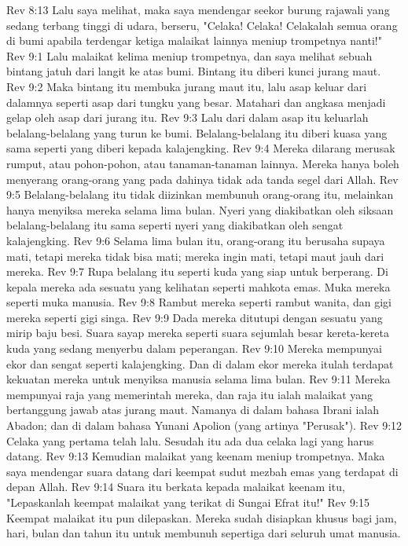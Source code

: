 Rev 8:13  Lalu saya melihat, maka saya mendengar seekor burung rajawali yang sedang terbang tinggi di udara, berseru, "Celaka! Celaka! Celakalah semua orang di bumi apabila terdengar ketiga malaikat lainnya meniup trompetnya nanti!"
Rev 9:1  Lalu malaikat kelima meniup trompetnya, dan saya melihat sebuah bintang jatuh dari langit ke atas bumi. Bintang itu diberi kunci jurang maut.
Rev 9:2  Maka bintang itu membuka jurang maut itu, lalu asap keluar dari dalamnya seperti asap dari tungku yang besar. Matahari dan angkasa menjadi gelap oleh asap dari jurang itu.
Rev 9:3  Lalu dari dalam asap itu keluarlah belalang-belalang yang turun ke bumi. Belalang-belalang itu diberi kuasa yang sama seperti yang diberi kepada kalajengking.
Rev 9:4  Mereka dilarang merusak rumput, atau pohon-pohon, atau tanaman-tanaman lainnya. Mereka hanya boleh menyerang orang-orang yang pada dahinya tidak ada tanda segel dari Allah.
Rev 9:5  Belalang-belalang itu tidak diizinkan membunuh orang-orang itu, melainkan hanya menyiksa mereka selama lima bulan. Nyeri yang diakibatkan oleh siksaan belalang-belalang itu sama seperti nyeri yang diakibatkan oleh sengat kalajengking.
Rev 9:6  Selama lima bulan itu, orang-orang itu berusaha supaya mati, tetapi mereka tidak bisa mati; mereka ingin mati, tetapi maut jauh dari mereka.
Rev 9:7  Rupa belalang itu seperti kuda yang siap untuk berperang. Di kepala mereka ada sesuatu yang kelihatan seperti mahkota emas. Muka mereka seperti muka manusia.
Rev 9:8  Rambut mereka seperti rambut wanita, dan gigi mereka seperti gigi singa.
Rev 9:9  Dada mereka ditutupi dengan sesuatu yang mirip baju besi. Suara sayap mereka seperti suara sejumlah besar kereta-kereta kuda yang sedang menyerbu dalam peperangan.
Rev 9:10  Mereka mempunyai ekor dan sengat seperti kalajengking. Dan di dalam ekor mereka itulah terdapat kekuatan mereka untuk menyiksa manusia selama lima bulan.
Rev 9:11  Mereka mempunyai raja yang memerintah mereka, dan raja itu ialah malaikat yang bertanggung jawab atas jurang maut. Namanya di dalam bahasa Ibrani ialah Abadon; dan di dalam bahasa Yunani Apolion (yang artinya "Perusak").
Rev 9:12  Celaka yang pertama telah lalu. Sesudah itu ada dua celaka lagi yang harus datang.
Rev 9:13  Kemudian malaikat yang keenam meniup trompetnya. Maka saya mendengar suara datang dari keempat sudut mezbah emas yang terdapat di depan Allah.
Rev 9:14  Suara itu berkata kepada malaikat keenam itu, "Lepaskanlah keempat malaikat yang terikat di Sungai Efrat itu!"
Rev 9:15  Keempat malaikat itu pun dilepaskan. Mereka sudah disiapkan khusus bagi jam, hari, bulan dan tahun itu untuk membunuh sepertiga dari seluruh umat manusia.
